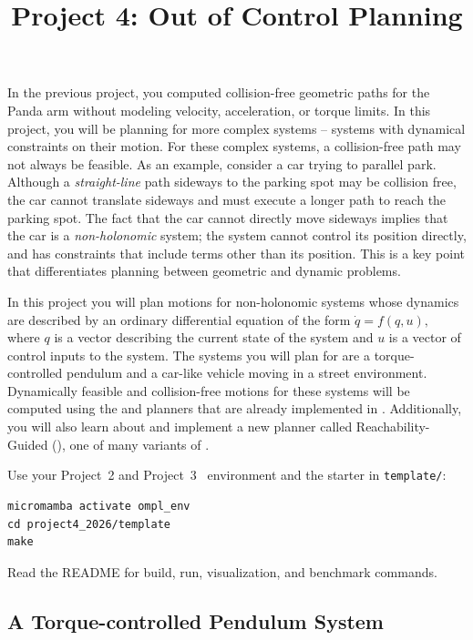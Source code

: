 \documentclass{comp450}
\title{Project 4: Out of Control Planning}
\author{}
\begin{document}
\maketitle

\ompldocinfo

In the previous project, you computed collision-free geometric paths for the Panda arm without modeling velocity, acceleration, or torque limits.
In this project, you will be planning for more complex systems -- systems with dynamical constraints on their motion.
For these complex systems, a collision-free path may not always be feasible.
As an example, consider a car trying to parallel park.
Although a \textit{straight-line} path sideways to the parking spot may be collision free, the car cannot translate sideways and must execute a longer path to reach the parking spot.
The fact that the car cannot directly move sideways implies that the car is a \textit{non-holonomic} system; the system cannot control its position directly, and has constraints that include terms other than its position.
This is a key point that differentiates planning between geometric and dynamic problems.

In this project you will plan motions for non-holonomic systems whose dynamics are described by an ordinary differential equation of the form $\dot q = f(q,u),$ where $q$ is a vector describing the current state of the system and $u$ is a vector of control inputs to the system.
The systems you will plan for are a torque-controlled pendulum and a car-like vehicle moving in a street environment.
Dynamically feasible and collision-free motions for these systems will be computed using the  and  planners that are already implemented in .
Additionally, you will also learn about and implement a new planner called Reachability-Guided  (), one of many variants of .

Use your Project~2 and Project~3 \ompl\ environment and the starter in \texttt{template/}:
\vspace*{-0.5\baselineskip}
\begin{verbatim}
micromamba activate ompl_env
cd project4_2026/template
make
\end{verbatim}
\vspace*{-0.5\baselineskip}
Read the README for build, run, visualization, and benchmark commands.

\clearpage
\subsection*{A Torque-controlled Pendulum System}
\end{document}
